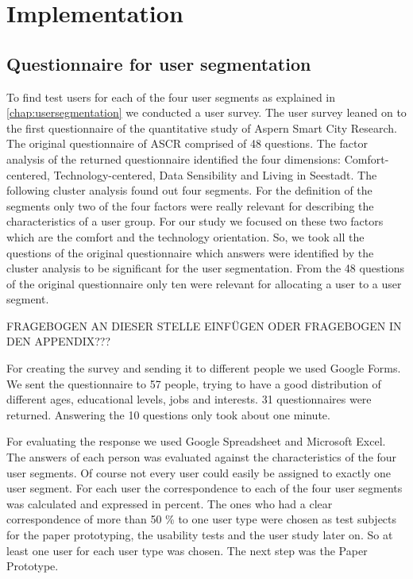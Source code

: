 \chapter{Implementation}

\section{Questionnaire for user segmentation}

To find test users for each of the four user segments as explained in \ref{chap:usersegmentation} we conducted a user survey. The user survey leaned on to the first questionnaire of the quantitative study of Aspern Smart City Research. The original questionnaire of ASCR comprised of 48 questions. The factor analysis of the returned questionnaire identified the four dimensions: Comfort-centered, Technology-centered, Data Sensibility and Living in Seestadt. The following cluster analysis found out four segments. For the definition of the segments only two of the four factors were really relevant for describing the characteristics of a user group. For our study we focused on these two factors which are the comfort and the technology orientation. So, we took all the questions of the original questionnaire which answers were identified by the cluster analysis to be significant for the user segmentation. From the 48 questions of the original questionnaire only ten were relevant for allocating a user to a user segment.

FRAGEBOGEN AN DIESER STELLE EINFÜGEN ODER FRAGEBOGEN IN DEN APPENDIX???


For creating the survey and sending it to different people we used Google Forms. We sent the questionnaire to 57 people, trying to have a good distribution of different ages, educational levels, jobs and interests. 31 questionnaires were returned. Answering the 10 questions only took about one minute.

For evaluating the response we used Google Spreadsheet and Microsoft Excel. The answers of each person was evaluated against the characteristics of the four user segments. Of course not every user could easily be assigned to exactly one user segment. For each user the correspondence to each of the four user segments was calculated and expressed in percent. The ones who had a clear correspondence of more than 50 \% to one user type were chosen as test subjects for the paper prototyping, the usability tests and the user study later on. So at least one user for each user type was chosen. The next step was the Paper Prototype.





